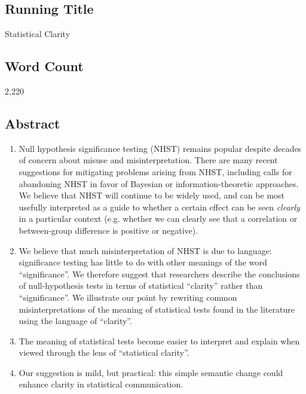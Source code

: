 
\flushbottom
\maketitle


\linenumbers

\subsection*{Running Title}

Statistical Clarity

\subsection*{Word Count}

2,220

\subsection*{Abstract}

\begin{enumerate}

\item Null hypothesis significance testing (NHST) remains popular despite decades of concern about misuse and misinterpretation. There are many recent suggestions for mitigating problems arising from NHST, including calls for abandoning NHST in favor of Bayesian or information-theoretic approaches. We believe that NHST will continue to be widely used, and can be most usefully interpreted as a guide to whether a certain effect can be seen \emph{clearly} in a particular context (e.g. whether we can clearly see that a correlation or between-group difference is positive or negative). 
\item We believe that much misinterpretation of NHST is due to language: significance testing has little to do with other meanings of the word ``significance''. We therefore suggest that researchers describe the conclusions of null-hypothesis tests in terms of statistical ``clarity'' rather than ``significance''. We illustrate our point by rewriting common misinterpretations of the meaning of statistical tests found in the literature using the language of ``clarity''.
\item The meaning of statistical tests become easier to interpret and explain when viewed through the lens of ``statistical clarity''.
\item Our suggestion is mild, but practical: this simple semantic change could enhance clarity in statistical communication.

\end{enumerate}

